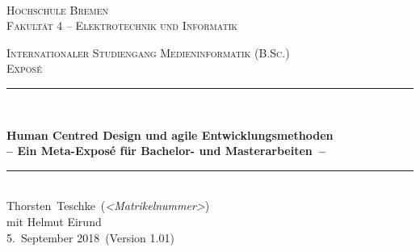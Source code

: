 \documentclass[11pt]{scrartcl}
\newcommand{\MetaInstitute}{Hochschule Bremen}
\newcommand{\MetaUnit}{Fakultät 4 -- Elektrotechnik und Informatik}
\newcommand{\MetaTitle}{Human Centred Design und agile Entwicklungsmethoden}
\newcommand{\MetaSubtitle}{Ein Meta-Exposé für Bachelor- und Masterarbeiten}
\newcommand{\MetaTask}{Exposé}
\newcommand{\MetaAuthorName}{Thorsten}
\newcommand{\MetaAuthorSurname}{Teschke}
\newcommand{\MetaAuthor}{\MetaAuthorName~\MetaAuthorSurname}
\newcommand{\MetaStudentNumber}{\textit{<Matrikelnummer>}}
\newcommand{\MetaStudyProgram}{Internationaler Studiengang Medieninformatik (B.Sc.)}
\newcommand{\MetaCoAuthor}{mit Helmut Eirund}
\newcommand{\MetaDate}{5.\ September 2018}
\newcommand{\MetaVersion}{1.01}
\newcommand{\HRule}{\rule{\linewidth}{0.2mm}}	%
\begin{document}
\begin{titlepage}
  	\shortdate %
  	\center %

  	~\\[1cm]


	\begin{figure}[h!]
    		\centering
	\end{figure}

	\vspace{-0.5cm}
	\textsc{\Large \MetaInstitute}\\[0.2cm] %
	\textsc{\Large \MetaUnit}%
	
	\textsc{\large \MetaStudyProgram}\\[1.5cm]
	
	\textsc{\LARGE \MetaTask}\\[1.5cm] %

	\HRule \\[0.5cm]
	{
		\LARGE \bfseries \MetaTitle \\[0.50cm] %
		\Large \bfseries -- \MetaSubtitle\ -- \\[0.50cm] %
		\par
	}
	\HRule \\[1.5cm]

	\large 
	\MetaAuthor\ (\MetaStudentNumber)\\
 	\MetaCoAuthor\\[0.25cm]

	\vspace*{\fill}
	{
     \large \MetaDate\ (Version \MetaVersion)
	}
\end{titlepage}
\end{document}
